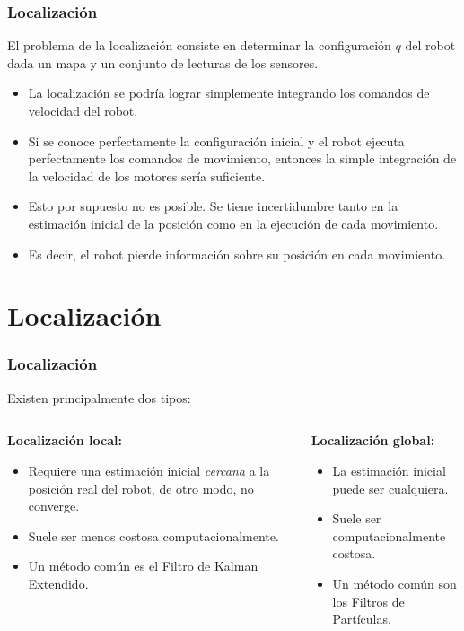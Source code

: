 \begin{frame}\frametitle{Localización}
  El problema de la localización consiste en determinar la configuración $q$ del robot dada un mapa y un conjunto de lecturas de los sensores.
  \begin{itemize}
  \item La localización se podría lograr simplemente integrando los comandos de velocidad del robot.
  \item Si se conoce perfectamente la configuración inicial y el robot ejecuta perfectamente los comandos de movimiento, entonces la simple integración de la velocidad de los motores sería suficiente.
  \item Esto por supuesto no es posible. Se tiene incertidumbre tanto en la estimación inicial de la posición como en la ejecución de cada movimiento.
  \item Es decir, el robot pierde información sobre su posición en cada movimiento. 
  \end{itemize}
\end{frame}

\section{Localización}

\begin{frame}\frametitle{Localización}
  Existen principalmente dos tipos:
\[\]
  \begin{columns}
    \begin{column}{0.5\textwidth}
      \textbf{Localización local: }
      \begin{itemize}
      \item Requiere una estimación inicial \textit{cercana} a la posición real del robot, de otro modo, no converge.
      \item Suele ser menos costosa computacionalmente.
      \item Un método común es el Filtro de Kalman Extendido.
      \end{itemize}
    \end{column}
    \begin{column}{0.5\textwidth}
      \textbf{Localización global:}
      \begin{itemize}
      \item La estimación inicial puede ser cualquiera.
      \item Suele ser computacionalmente costosa.
      \item Un método común son los Filtros de Partículas. 
      \end{itemize}
      \[\]
      \[\]
    \end{column}
  \end{columns}
\end{frame}

